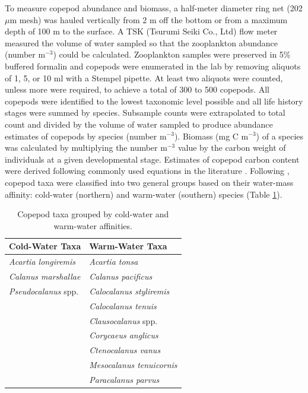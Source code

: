 \documentclass[preprint, authoryear, 12pt]{elsarticle}
\begin{document}
To measure copepod abundance and biomass, a half-meter diameter ring net (202 $\mu$m mesh) was hauled vertically from 2 m off the bottom or from a maximum depth of 100 m to the surface.  A TSK (Tsurumi Seiki Co., Ltd) flow meter measured the volume of water sampled so that the zooplankton abundance (number m$^{-3}$) could be calculated.  Zooplankton samples were preserved in 5\% buffered formalin and copepods were enumerated in the lab by removing aliquots of 1, 5, or 10 ml with a Stempel pipette.  At least two aliquots were counted, unless more were required, to achieve a total of 300 to 500 copepods.  All copepods were identified to the lowest taxonomic level possible and all life history stages were summed by species.  Subsample counts were extrapolated to total count and divided by the volume of water sampled  to produce abundance estimates of copepods by species (number m$^{-3}$).  Biomass (mg C m$^{-3}$) of a species was calculated by multiplying the number m$^{-3}$ value by the carbon weight of individuals at a given developmental stage.  Estimates of copepod carbon content were derived following commonly used equations in the literature \citep{robertson1968continuous, peterson1980life, uye1982length, breteler1988influence, chisholm1990size, webber1995annual}. Following \citet{fisher2015impact}, copepod taxa were classified into two general groups based on their water-mass affinity: cold-water (northern) and warm-water (southern) species (Table \ref{tab:copepod_table}).
\begin{table}
    \footnotesize
    \centering
    \begin{tabular}{ll}
    \hline
    \hline
         Cold-Water Taxa & Warm-Water Taxa   \\
         \hline
         \textit{Acartia longiremis} & \textit{Acartia tonsa} \\
         \textit{Calanus marshallae} & \textit{Calanus pacificus} \\
         \textit{Pseudocalanus} spp. & \textit{Calocalanus styliremis} \\
          & \textit{Calocalanus tenuis} \\
          & \textit{Clausocalanus} spp. \\
          & \textit{Corycaeus anglicus} \\
          & \textit{Ctenocalanus vanus} \\
          & \textit{Mesocalanus tenuicornis} \\
          & \textit{Paracalanus parvus} \\
         \hline
    \end{tabular}
    \caption{Copepod taxa grouped by cold-water and warm-water affinities.}
    \label{tab:copepod_table}
\end{table}
\end{document}
